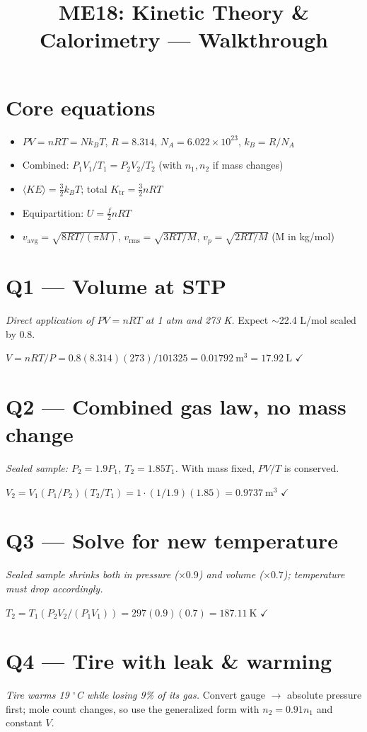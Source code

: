 \documentclass[11pt]{article}
\title{ME18: Kinetic Theory \& Calorimetry --- Walkthrough}
\author{}\date{}
\newcommand{\checkmk}{\ensuremath{\checkmark}}
\begin{document}
\maketitle

\section*{Core equations}
\begin{itemize}[leftmargin=*]
\item $PV = nRT = Nk_BT$, $R = 8.314$, $N_A = 6.022\times10^{23}$, $k_B = R/N_A$
\item Combined: $P_1V_1/T_1 = P_2V_2/T_2$ (with $n_1,n_2$ if mass changes)
\item $\langle KE\rangle = \tfrac32 k_BT$; total $K_{\text{tr}} = \tfrac32 nRT$
\item Equipartition: $U = \tfrac{f}{2}nRT$
\item $v_{\text{avg}} = \sqrt{8RT/(\pi M)}$, $v_{\text{rms}} = \sqrt{3RT/M}$, $v_p = \sqrt{2RT/M}$ (M in kg/mol)
\end{itemize}

\section*{Q1 --- Volume at STP}
\emph{Direct application of $PV=nRT$ at 1 atm and 273 K.} Expect $\sim$22.4 L/mol scaled by 0.8.

$V = nRT/P = 0.8(8.314)(273)/101325 = 0.01792\ \text{m}^3 = \boxed{17.92\ \text{L}}$ \checkmk

\section*{Q2 --- Combined gas law, no mass change}
\emph{Sealed sample: $P_2=1.9P_1$, $T_2=1.85T_1$.} With mass fixed, $PV/T$ is conserved.

$V_2 = V_1(P_1/P_2)(T_2/T_1) = 1\cdot(1/1.9)(1.85) = \boxed{0.9737\ \text{m}^3}$ \checkmk

\section*{Q3 --- Solve for new temperature}
\emph{Sealed sample shrinks both in pressure ($\times 0.9$) and volume ($\times 0.7$); temperature must drop accordingly.}

$T_2 = T_1(P_2V_2/(P_1V_1)) = 297(0.9)(0.7) = \boxed{187.11\ \text{K}}$ \checkmk

\section*{Q4 --- Tire with leak \& warming}
\emph{Tire warms 19 $^\circ$C while losing 9\% of its gas.} Convert gauge $\to$ absolute pressure first; mole count changes, so use the generalized form with $n_2 = 0.91 n_1$ and constant $V$.
\end{document}
